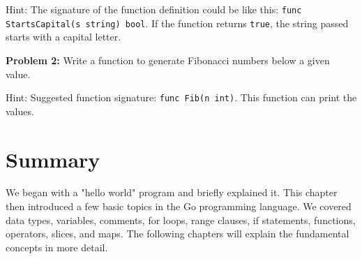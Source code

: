 Hint: The signature of the function definition could be like this:
\texttt{func StartsCapital(s string) bool}.  If the function returns
\texttt{true}, the string passed starts with a capital letter.

\textbf{Problem 2:} Write a function to generate Fibonacci numbers below a
given value.

Hint: Suggested function signature: \texttt{func Fib(n int)}.  This
function can print the values.

\section*{Summary}

We began with a "hello world" program and briefly explained it. This chapter
then introduced a few basic topics in the Go programming language. We covered
data types, variables, comments, for loops, range clauses, if statements,
functions, operators, slices, and maps. The following chapters will explain the
fundamental concepts in more detail.
